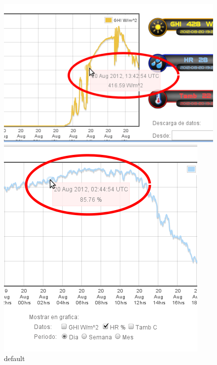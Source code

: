 \begin{figure}[ht]
	\begin{minipage}[b]{0.45\linewidth}
        	\centering
        	\includegraphics[width=\textwidth]{./images/cap5chap1img4-1}
        	\caption{default}
        	\label{fig:figure1}
	\end{minipage}
	\begin{minipage}[b]{0.45\linewidth}
                \centering
                \includegraphics[width=\textwidth]{./images/cap5chap1img4-2}

\end{minipage}
\end{figure}
